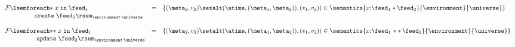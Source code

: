 \begin{figure*}[t]
\[\begin{array}{lcl}




{\cal F}\lsem
\mathtt{foreach{*}}\; x \; \mathtt{in}\; \feed_1 
 &=&
   \{(\meta_2,v_2) \setalt (\atime,(\meta_1,\meta_2)),(v_1,v_2)) \in 
       \semantics{x{:}\feed_1 * \feed_2}{\environment}{\universe} \}
\\
\qquad\qquad\ \ \mathtt{create}\; \feed_2 \rsem_{{\environment} \, {\universe}}
\\\\


{\cal F}\lsem
\mathtt{foreach{*}{*}}\; x \; \mathtt{in}\; \feed_1 
 &=&
   \{(\meta_2,v_2) \setalt (\atime,(\meta_1,\meta_2)),(v_1,v_2)) \in 
       \semantics{x{:}\feed_1\, **\, \feed_2}{\environment}{\universe} \}\\
\qquad\qquad\ \ \ \mathtt{update}\; \feed_2 \rsem_{{\environment} \, {\universe}}
\\\\


\end{array}\]
\end{figure*}
